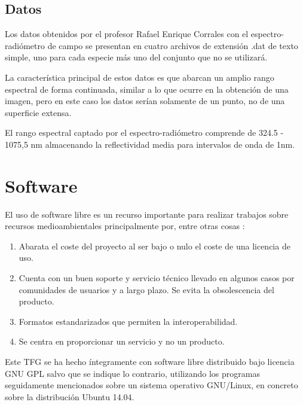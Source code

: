 \subsection{Datos}\label{subsec:datos}
Los datos obtenidos por el profesor Rafael Enrique Corrales con el espectro-radiómetro de campo se presentan en cuatro archivos de extensión .dat de texto simple, uno para cada especie más uno del conjunto que no se utilizará.\Sep

La característica principal de estos datos es que abarcan un amplio rango espectral de forma continuada, similar a lo que ocurre en la obtención de una imagen, pero en este caso los datos serían solamente de un punto, no de una superficie extensa.\Sep

El rango espectral captado por el espectro-radiómetro comprende de 324.5 - 1075,5 nm almacenando la reflectividad media para intervalos de onda de 1nm.

\section{Software} \label{sec:software}
El uso de software libre es un recurso importante para realizar trabajos sobre recursos medioambientales principalmente por, entre otras cosas \citep{MatellanOliveira2004}:

\begin{enumerate}
	\item Abarata el coste del proyecto al ser bajo o nulo el coste de una licencia de uso.
	\item Cuenta con un buen soporte y servicio técnico llevado en algunos casos por comunidades de usuarios y a largo plazo. Se evita la obsolescencia del producto.
	\item Formatos estandarizados que permiten la interoperabilidad.
	\item Se centra en proporcionar un servicio y no un producto.
\end{enumerate}

Este \ac{TFG} se ha hecho íntegramente con software libre distribuido bajo licencia GNU GPL salvo que se indique lo contrario, utilizando los programas seguidamente mencionados sobre un sistema operativo GNU/Linux, en concreto sobre la distribución Ubuntu 14.04.\Sep

